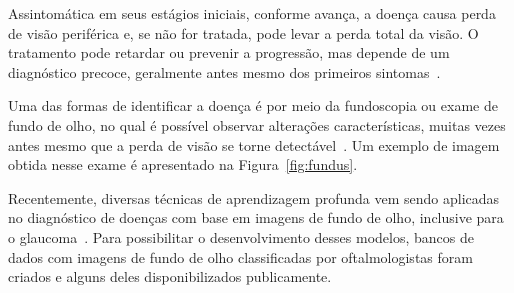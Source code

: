 \documentclass[12pt]{article}
\begin{document}
Assintomática em seus estágios iniciais, conforme avança, a doença causa perda de visão periférica e, se não for tratada, pode levar a perda total da visão. O tratamento pode retardar ou prevenir a progressão, mas depende de um diagnóstico precoce, geralmente antes mesmo dos primeiros sintomas~\cite{who_2019}.

Uma das formas de identificar a doença é por meio da fundoscopia ou exame de fundo de olho, no qual é possível observar alterações características, muitas vezes antes mesmo que a perda de visão se torne detectável~\cite{weinreb_2016}. Um exemplo de imagem obtida nesse exame é apresentado na Figura~\ref{fig:fundus}.

Recentemente, diversas técnicas de aprendizagem profunda vem sendo aplicadas no diagnóstico de doenças com base em imagens de fundo de olho, inclusive para o glaucoma~\cite{li_review_2021}. Para possibilitar o desenvolvimento desses modelos, bancos de dados com imagens de fundo de olho classificadas por oftalmologistas foram criados e alguns deles disponibilizados publicamente.%
\end{document}
